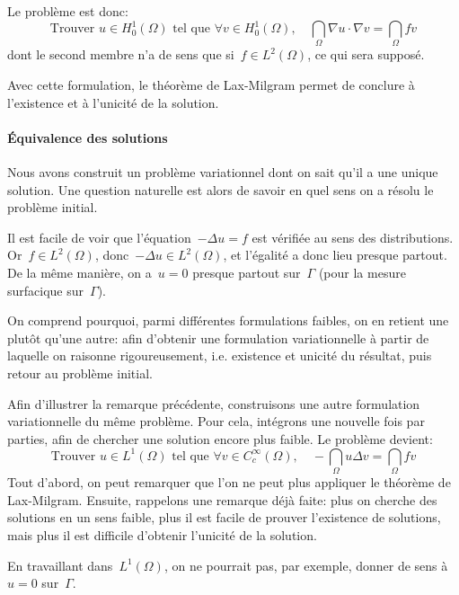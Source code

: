 Le problème est donc:
\begin{equation}
\text{Trouver } u \in H^1_0(\Omega) \text{ tel que }
\forall v\in H^1_0(\Omega),\quad
\dint_\Omega \nabla u\cdot\nabla v = \dint_\Omega fv
\end{equation}
dont le second membre n'a de sens que si~$f\in L^2(\Omega)$, ce qui sera supposé.

Avec cette formulation, le théorème de Lax-Milgram permet de conclure à l'existence et à l'unicité de la solution.

\medskip{}
\paragraph{Équivalence des solutions}
Nous avons construit un problème variationnel dont on sait qu'il a une unique solution. Une question naturelle est alors de savoir en quel sens on a résolu le problème initial.

Il est facile de voir que l'équation~$-\Delta u = f$ est vérifiée au sens des distributions. Or~$f\in L^2(\Omega)$, donc~$-\Delta u \in L^2(\Omega)$, et l'égalité a donc lieu presque partout. De la même manière, on a~$u = 0$ presque partout sur~$\Gamma$ (pour la mesure surfacique sur~$\Gamma$).

On comprend pourquoi, parmi différentes formulations faibles, on en retient une plutôt qu'une autre: afin d'obtenir une formulation variationnelle à partir de laquelle on raisonne rigoureusement, i.e. existence et unicité du résultat, puis retour au problème initial.

\medskip{}
\begin{remarque}
Afin d'illustrer la remarque précédente, construisons une autre formulation variationnelle du même problème. Pour cela, intégrons une nouvelle fois par parties, afin de chercher une solution encore plus faible. Le problème devient:
\begin{equation}
\text{Trouver } u \in L^1(\Omega) \text{ tel que }
\forall v\in C_c^\infty(\Omega),\quad
-\dint_\Omega u\Delta v = \dint_\Omega fv
\end{equation}
Tout d'abord, on peut remarquer que l'on ne peut plus appliquer le théorème de Lax-Milgram. Ensuite, rappelons une remarque déjà faite: plus on cherche des solutions en un sens faible, plus il est facile de prouver l'existence de solutions, mais plus il est difficile d'obtenir l'unicité de la solution.

En travaillant dans~$L^1(\Omega)$, on ne pourrait pas, par exemple, donner de sens à~$u = 0$ sur~$\Gamma$.
\end{remarque}

